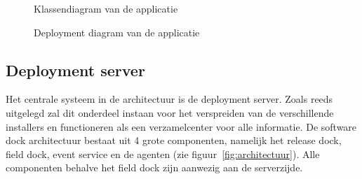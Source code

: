 \begin{figure}[!ht]
\centering
{}
\caption{Klassendiagram van de applicatie}
\label{fig:classDiagram}
\caption{Deployment diagram van de applicatie}
\label{fig:deploymentDiagram}
\end{figure}
\clearpage

\subsection{Deployment server}
Het centrale systeem in de architectuur is de deployment server.
Zoals reeds uitgelegd zal dit onderdeel instaan voor het verspreiden van de verschillende installers en functioneren als een verzamelcenter voor alle informatie.
De software dock architectuur bestaat uit 4 grote componenten, namelijk het release dock, field dock, event service en de agenten (zie figuur~\ref{fig:architectuur}).
Alle componenten behalve het field dock zijn aanwezig aan de serverzijde.

